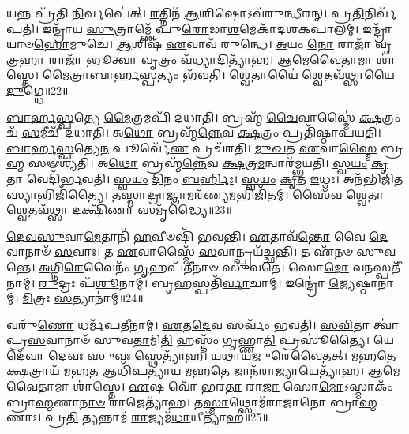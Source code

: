 𑌯𑌨𑍍𑌨 𑌪𑍍𑌰᳴𑌤𑌿 \ul{𑌨𑌿}\-𑌰𑍍𑌵𑌪𑍇॑𑌤𑍍।
\-\ul{𑌰}\-𑌤𑍍𑌨𑌿𑌨᳴ \ul{𑌆}\-𑌶𑌿𑌷𑍋\-𑌽𑌵᳴𑌰𑍁𑌨𑍍𑌧𑍀𑌰𑌨𑍍।
𑌪𑍍𑌰\-\ul{𑌤𑌿}\-𑌨𑌿𑌰𑍍𑌵᳴𑌪𑌤𑌿।
𑌇𑌨𑍍𑌦𑍍𑌰𑌾᳴𑌯 \ul{𑌸𑍁}\-𑌤𑍍𑌰𑌾𑌮𑍍𑌣𑍇᳴ 𑌪𑍁\-\ul{𑌰𑍋}\-𑌡𑌾\-\ul{𑌶}\-𑌮𑍇𑌕𑌾᳴\-𑌦𑌶\-𑌕𑌪𑌾𑌲𑌮𑍍।
𑌇𑌨𑍍𑌦𑍍𑌰𑌾᳴𑌯𑌾𑍞\-\ul{𑌹𑍋}\-𑌮𑍁𑌚𑍇॑।
\-\ul{𑌆}\-𑌶𑌿𑌷᳴ \ul{𑌏}\-𑌵𑌾𑌵᳴ 𑌰𑍁𑌨𑍍𑌧𑍇।
\-\ul{𑌅}\-𑌯𑌂 \ul{𑌨𑍋} 𑌰𑌾𑌜𑌾᳴ 𑌵𑍃\-\ul{𑌤𑍍𑌰}\-𑌹𑌾 𑌰𑌾𑌜𑌾᳴ \ul{𑌭𑍂}\-𑌤𑍍𑌵𑌾 \ul{𑌵𑍃}\-𑌤𑍍𑌰𑌂 𑌵᳴\-\ul{𑌧𑍍𑌯𑌾}\-𑌦𑌿𑌤𑍍𑌯𑌾᳴𑌹।
\-\ul{𑌆}\-\-\-\ul{𑌮𑍇}\-𑌵𑍈𑌤𑌾𑌮𑌾 𑌶𑌾॑𑌸𑍍𑌤𑍇।
\-\ul{𑌮𑍈}\-\-\ul{𑌤𑍍𑌰𑌾}\-\-\ul{𑌬𑌾}\-\-\ul{𑌰𑍍}\-\-\ul{𑌹}\-\-\ul{𑌸𑍍𑌪}\-𑌤𑍍𑌯𑌂 𑌭᳴𑌵𑌤𑌿।
\-\ul{𑌶𑍍𑌵𑍇}\-𑌤𑌾𑌯𑍈॑ \ul{𑌶𑍍𑌵𑍇}\-𑌤𑌵᳴𑌥𑍍𑌸𑌾𑌯𑍈 \ul{𑌦𑍁}\-𑌗𑍍𑌧𑍇॥22॥

\-\ul{𑌬𑌾}\-\-\ul{𑌰𑍍}\-\-\ul{𑌹}\-\-\ul{𑌸𑍍𑌪}\-𑌤𑍍𑌯𑍇 \ul{𑌮𑍈}\-𑌤𑍍𑌰𑌮𑌪𑌿᳴ 𑌦𑌧𑌾𑌤𑌿।
𑌬𑍍𑌰𑌹𑍍𑌮᳴ \ul{𑌚𑍈}\-𑌵𑌾𑌸𑍍𑌮𑍈॑ \ul{𑌕𑍍𑌷}\-𑌤𑍍𑌰𑌂 𑌚᳴ \ul{𑌸}\-𑌮𑍀𑌚𑍀᳴ 𑌦𑌧𑌾𑌤𑌿।
𑌅\-\ul{𑌥𑍋} 𑌬𑍍𑌰𑌹𑍍𑌮᳴\-\ul{𑌨𑍍𑌨𑍇}\-𑌵 \ul{𑌕𑍍𑌷}\-𑌤𑍍𑌰𑌂 𑌪𑍍𑌰𑌤𑌿᳴\-𑌷𑍍𑌠𑌾𑌪𑌯𑌤𑌿।
\-\ul{𑌬𑌾}\-\-\ul{𑌰𑍍}\-\-\ul{𑌹}\-\-\ul{𑌸𑍍𑌪}\-𑌤𑍍𑌯𑍇\-\ul{𑌨} 𑌪𑍂𑌰𑍍𑌵𑍇᳴\-\ul{𑌣} 𑌪𑍍𑌰𑌚᳴𑌰𑌤𑌿।
\-\ul{𑌮𑍁}\-\-\ul{𑌖}\-𑌤 \ul{𑌏}\-𑌵𑌾\-\ul{𑌸𑍍𑌮𑍈} 𑌬𑍍𑌰\-\ul{𑌹𑍍𑌮} 𑌸𑍟𑌶𑍍𑌯᳴𑌤𑌿।
𑌅\-\ul{𑌥𑍋} 𑌬𑍍𑌰𑌹𑍍𑌮᳴\-\ul{𑌨𑍍𑌨𑍇}\-𑌵 \ul{𑌕𑍍𑌷}\-𑌤𑍍𑌰\-\ul{𑌮}\-𑌨𑍍𑌵𑌾𑌰᳴𑌮𑍍𑌭𑌯𑌤𑌿।
\-\ul{𑌸𑍍𑌵}\-\-\ul{𑌯𑌂} \ul{𑌕𑍃}\-𑌤𑌾 𑌵𑍇𑌦𑌿᳴𑌰𑍍𑌭𑌵𑌤𑌿।
\-\ul{𑌸𑍍𑌵}\-\-\ul{𑌯𑌂} \ul{𑌦𑌿}\-𑌨𑌂 \ul{𑌬}\-\-\ul{𑌰𑍍}\-𑌹𑌿𑌃।
\-\ul{𑌸𑍍𑌵}\-\-\ul{𑌯𑌂} \ul{𑌕𑍃}\-𑌤 \ul{𑌇}\-𑌧𑍍𑌮𑌃।
𑌅𑌨᳴𑌭𑌿𑌜𑌿𑌤\-\ul{𑌸𑍍𑌯𑌾}\-𑌭𑌿𑌜𑌿᳴𑌤𑍍𑌯𑍈।
𑌤\-\ul{𑌸𑍍𑌮𑌾}\-𑌦𑍍𑌰𑌾\-\ul{𑌜𑍍𑌞𑌾}\-𑌮𑌰᳴𑌣𑍍𑌯\-\ul{𑌮}\-𑌭𑌿𑌜𑌿᳴𑌤𑌮𑍍।
𑌸𑍈𑌵 \ul{𑌶𑍍𑌵𑍇}\-𑌤𑌾 \ul{𑌶𑍍𑌵𑍇}\-𑌤𑌵᳴\-\ul{𑌥𑍍𑌸𑌾} 𑌦𑌕𑍍𑌷𑌿᳴\-\ul{𑌣𑌾} 𑌸𑌮𑍃᳴𑌦𑍍𑌧𑍍𑌯𑍈॥23॥\anuvakamend[\-\ul{𑌰}\-\-\ul{𑌤𑍍𑌨𑌿}\-𑌤𑍍𑌵𑌾\-\ul{𑌯} 𑌸𑌮𑍃᳴𑌦𑍍𑌧𑍍𑌯𑍈 𑌪\-\ul{𑌷𑍍𑌠𑍗}\-𑌹𑍀 𑌦𑌕𑍍𑌷𑌿᳴\-\ul{𑌣𑌾} 𑌸𑌮𑍃᳴𑌦𑍍𑌧𑍍𑌯𑍈 𑌗𑍍𑌰𑌾\-\ul{𑌮}\-𑌣𑍍𑌯𑍋᳴ \ul{𑌗𑍃}\-𑌹𑍇 𑌭𑌾᳴𑌗\-\ul{𑌦𑍁}\-𑌘𑌸𑍍𑌯᳴ \ul{𑌗𑍃}\-𑌹𑍇 𑌭᳴𑌵𑌤𑌿 \ul{𑌦𑍁}\-𑌗𑍍𑌧𑍇᳴\-𑌽𑌭𑌿𑌜𑌿᳴\-\ul{𑌤𑍍𑌯𑍈} 𑌦𑍍𑌵𑍇 𑌚᳴]

\-\ul{𑌦𑍇}\-\-\ul{𑌵}\-\-\ul{𑌸𑍁}\-𑌵𑌾\-\ul{𑌮𑍇}\-𑌤𑌾𑌨𑌿᳴ \ul{𑌹}\-𑌵𑍀𑍞𑌷𑌿᳴ 𑌭𑌵𑌨𑍍𑌤𑌿।
\-\ul{𑌏}\-𑌤𑌾𑌵᳴\-\ul{𑌨𑍍𑌤𑍋} 𑌵𑍈 \ul{𑌦𑍇}\-𑌵𑌾𑌨𑌾𑍞᳴ \ul{𑌸}\-𑌵𑌾𑌃।
𑌤 \ul{𑌏}\-𑌵𑌾𑌸𑍍𑌮𑍈᳴ \ul{𑌸}\-𑌵𑌾𑌨𑍍𑌪𑍍𑌰𑌯᳴𑌚𑍍𑌛𑌨𑍍𑌤𑌿।
𑌤 𑌏᳴𑌨𑍞 𑌸𑍁𑌵𑌨𑍍𑌤𑍇।
\-\ul{𑌅}\-𑌗𑍍𑌨𑌿\-\ul{𑌰𑍇}\-𑌵𑍈𑌨𑌂᳴ \ul{𑌗𑍃}\-𑌹𑌪᳴𑌤𑍀𑌨𑌾𑍞 𑌸𑍁𑌵𑌤𑍇।
𑌸𑍋\-\ul{𑌮𑍋} 𑌵\-\ul{𑌨}\-𑌸𑍍𑌪𑌤𑍀᳴𑌨𑌾𑌮𑍍।
\-\ul{𑌰𑍁}\-𑌦𑍍𑌰𑌃 𑌪᳴\-\ul{𑌶𑍂}\-𑌨𑌾𑌮𑍍।
𑌬𑍃\-\ul{𑌹}\-𑌸𑍍𑌪𑌤𑌿᳴\-\ul{𑌰𑍍𑌵𑌾}\-𑌚𑌾𑌮𑍍।
𑌇𑌨𑍍𑌦𑍍𑌰𑍋॑ \ul{𑌜𑍍𑌯𑍇}\-𑌷𑍍𑌠𑌾𑌨𑌾॑𑌮𑍍।
\-\ul{𑌮𑌿}\-𑌤𑍍𑌰𑌃 \ul{𑌸}\-𑌤𑍍𑌯𑌾𑌨𑌾॑𑌮𑍍॥24॥

𑌵𑌰𑍁᳴\-\ul{𑌣𑍋} 𑌧𑌰𑍍𑌮᳴𑌪𑌤𑍀𑌨𑌾𑌮𑍍।
\-\ul{𑌏}\-𑌤\-\ul{𑌦𑍇}\-𑌵 𑌸𑌰𑍍𑌵𑌂᳴ 𑌭𑌵𑌤𑌿।
\-\ul{𑌸}\-\-\ul{𑌵𑌿}\-𑌤𑌾 𑌤𑍍𑌵𑌾॑ 𑌪𑍍𑌰\-\ul{𑌸}\-𑌵𑌾𑌨𑌾𑍞᳴ 𑌸𑍁𑌵\-\ul{𑌤𑌾}\-𑌮𑌿\-\ul{𑌤𑌿} 𑌹𑌸𑍍𑌤𑌂᳴ 𑌗𑍃𑌹𑍍𑌣𑌾\-\ul{𑌤𑌿} 𑌪𑍍𑌰𑌸𑍂॑𑌤𑍍𑌯𑍈।
𑌯𑍇 𑌦𑍇᳴𑌵𑌾 𑌦𑍇\-\ul{𑌵𑌃} 𑌸𑍁\-\ul{𑌵𑌃} 𑌸𑍍𑌥𑍇𑌤𑍍𑌯𑌾᳴𑌹।
\-\ul{𑌯}\-\-\ul{𑌥𑌾}\-\-\ul{𑌯}\-𑌜𑍁\-\ul{𑌰𑍇}\-𑌵𑍈𑌤𑌤𑍍।
\-\ul{𑌮}\-\-\ul{𑌹}\-𑌤𑍇 \ul{𑌕𑍍𑌷}\-𑌤𑍍𑌰𑌾𑌯᳴ 𑌮\-\ul{𑌹}\-𑌤 𑌆𑌧𑌿᳴𑌪𑌤𑍍𑌯𑌾𑌯 𑌮\-\ul{𑌹}\-𑌤𑍇 𑌜𑌾𑌨᳴𑌰𑌾\-\ul{𑌜𑍍𑌯𑌾}\-𑌯𑍇𑌤𑍍𑌯𑌾᳴𑌹।
\-\ul{𑌆}\-\-\-\ul{𑌮𑍇}\-𑌵𑍈𑌤𑌾𑌮𑌾 𑌶𑌾॑𑌸𑍍𑌤𑍇।
\-\ul{𑌏}\-𑌷 𑌵𑍋᳴ 𑌭𑌰\-\ul{𑌤𑌾} 𑌰𑌾\-\ul{𑌜𑌾} 𑌸𑍋\-\ul{𑌮𑍋}\-\-𑌽𑌸𑍍𑌮𑌾𑌕𑌂᳴ 𑌬𑍍𑌰𑌾\-\ul{𑌹𑍍𑌮}\-𑌣𑌾\-\ul{𑌨𑌾}\-\-\ul{𑍞} 𑌰𑌾𑌜𑍇𑌤𑍍𑌯𑌾᳴𑌹।
𑌤\-\ul{𑌸𑍍𑌮𑌾}\-𑌥𑍍𑌸𑍋𑌮᳴𑌰𑌾𑌜𑌾𑌨𑍋 𑌬𑍍𑌰𑌾\-\ul{𑌹𑍍𑌮}\-𑌣𑌾𑌃।
𑌪𑍍𑌰\-\ul{𑌤𑌿} 𑌤𑍍𑌯𑌨𑍍𑌨𑌾𑌮᳴ \ul{𑌰𑌾}\-𑌜𑍍𑌯𑌮᳴\-\ul{𑌧𑌾}\-𑌯𑍀𑌤𑍍𑌯𑌾᳴𑌹॥25॥

